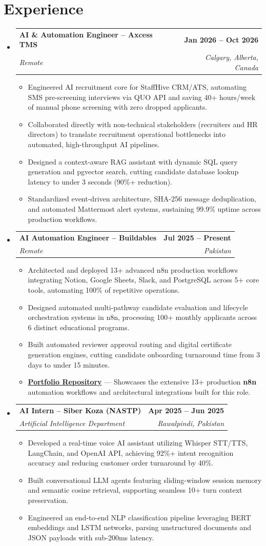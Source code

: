 \documentclass[letterpaper,10.5pt]{article}
\makeatletter
\newcommand{\resumeItem}[1]{\item \small{#1}}
\newcommand{\resumeSubheading}[4]{
  \vspace{-2pt}\item
    \begin{tabular*}{1.0\textwidth}[t]{l@{\extracolsep{\fill}}r}
      \textbf{#1} & \textbf{\small #2} \\
      \textit{\small#3} & \textit{\small #4} \\
    \end{tabular*}\vspace{-7pt}
}
\newcommand{\resumeSubHeadingListStart}{\begin{itemize}[leftmargin=0.0in, label={}]}
\newcommand{\resumeSubHeadingListEnd}{\end{itemize}}
\newcommand{\resumeItemListStart}{\begin{itemize}[leftmargin=0.15in, label=\textbullet]}
\newcommand{\resumeItemListEnd}{\end{itemize}\vspace{-5pt}}
\makeatother
\begin{document}
\section{Experience}
\resumeSubHeadingListStart
  \resumeSubheading
    {AI \& Automation Engineer – Axcess TMS}{Jan 2026 – Oct 2026}
    {Remote}{Calgary, Alberta, Canada}
    \resumeItemListStart
        \resumeItem{Engineered AI recruitment core for StaffHive CRM/ATS, automating SMS pre-screening interviews via QUO API and saving 40+ hours/week of manual phone screening with zero dropped applicants.}
        \resumeItem{Collaborated directly with non-technical stakeholders (recruiters and HR directors) to translate recruitment operational bottlenecks into automated, high-throughput AI pipelines.}
        \resumeItem{Designed a context-aware RAG assistant with dynamic SQL query generation and pgvector search, cutting candidate database lookup latency to under 3 seconds (90\%+ reduction).}
        \resumeItem{Standardized event-driven architecture, SHA-256 message deduplication, and automated Mattermost alert systems, sustaining 99.9\% uptime across production workflows.}
    \resumeItemListEnd
  \resumeSubheading
    {AI Automation Engineer – Buildables}{Jul 2025 – Present}
    {Remote}{Pakistan}
    \resumeItemListStart
        \resumeItem{Architected and deployed 13+ advanced n8n production workflows integrating Notion, Google Sheets, Slack, and PostgreSQL across 5+ core tools, automating 100\% of repetitive operations.}
        \resumeItem{Designed automated multi-pathway candidate evaluation and lifecycle orchestration systems in n8n, processing 100+ monthly applicants across 6 distinct educational programs.}
        \resumeItem{Built automated reviewer approval routing and digital certificate generation engines, cutting candidate onboarding turnaround time from 3 days to under 15 minutes.}
        \resumeItem{\href{https://github.com/junaidasif-dev/n8n-portfolio}{\textbf{Portfolio Repository}} — Showcases the extensive 13+ production \textbf{n8n} automation workflows and architectural integrations built for this role.}
    \resumeItemListEnd
  \resumeSubheading
    {AI Intern – Siber Koza (NASTP)}{Apr 2025 – Jun 2025}
    {Artificial Intelligence Department}{Rawalpindi, Pakistan}
    \resumeItemListStart
        \resumeItem{Developed a real-time voice AI assistant utilizing Whisper STT/TTS, LangChain, and OpenAI API, achieving 92\%+ intent recognition accuracy and reducing customer order turnaround by 40\%.}
        \resumeItem{Built conversational LLM agents featuring sliding-window session memory and semantic cosine retrieval, supporting seamless 10+ turn context preservation.}
        \resumeItem{Engineered an end-to-end NLP classification pipeline leveraging BERT embeddings and LSTM networks, parsing unstructured documents and JSON payloads with sub-200ms latency.}
    \resumeItemListEnd
\resumeSubHeadingListEnd
\end{document}
